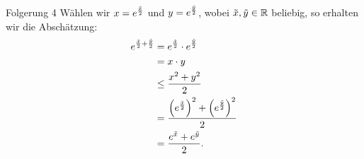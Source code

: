 \documentclass[10pt]{beamer}
\def\bR{\mathbb{R}}
\begin{document}
\begin{frame}{Folgerung 4}
    Wählen wir \( x = e^{\frac{\Tilde{x}}{2}} \) und \( y = e^{\frac{\Tilde{y}}{2}} \), wobei \( \Tilde{x}, \Tilde{y} \in \bR \) beliebig, so erhalten wir die Abschätzung:
    \begin{align*}
        e^{\frac{\Tilde{x}}{2} + \frac{\Tilde{y}}{2}}
        & = e^{\frac{\Tilde{x}}{2}} \cdot e^{\frac{\Tilde{y}}{2}} \\
        & = x \cdot y \\
        & \leq \frac{x^{2} + y^{2}}{2} \\
        & = \frac{\left( e^{\frac{\Tilde{x}}{2}} \right)^{2} + \left( e^{\frac{\Tilde{y}}{2}} \right)^{2}}{2} \\
        & = \frac{e^{\Tilde{x}} + e^{\Tilde{y}}}{2}.
    \end{align*}
\end{frame}
\end{document}
